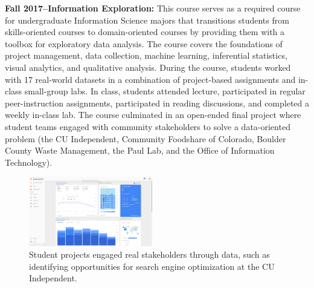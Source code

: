 \documentclass[11pt]{article}
\begin{document}
\textbf{Fall 2017--Information Exploration: } 
This course serves as a required course for undergraduate Information Science majors that transitions students from skills-oriented courses to domain-oriented courses by providing them with a toolbox for exploratory data analysis. The course covers the foundations of project management, data collection, machine learning, inferential statistics, visual analytics, and qualitative analysis. 
During the course, students worked with 17 real-world datasets in a combination of project-based assignments and in-class small-group labs. In class, students attended lecture, participated in regular peer-instruction assignments, participated in reading discussions, and completed a weekly in-class lab. The course culminated in an open-ended final project where student teams engaged with community stakeholders to solve a data-oriented problem (the CU Independent, Community Foodshare of Colorado, Boulder County Waste Management, the Paul Lab, and the Office of Information Technology). 

\begin{figure}
	\begin{center}
		\includegraphics[width=0.48\textwidth]{3401_example}
	\end{center}
	\caption{Student projects engaged real stakeholders through data, such as identifying opportunities for search engine optimization at the CU Independent.}
\end{figure}
\end{document}
